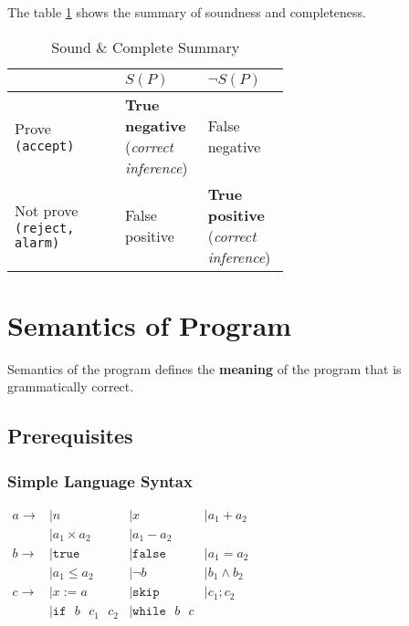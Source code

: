 The table \ref{tab:summary} shows the summary of soundness and
completeness.

\begin{table}[ht]
  \centering
  \caption{Sound \& Complete Summary}
  \label{tab:summary}

  \begin{tabular}[t]{l>{\raggedright}p{0.3\linewidth}>{\raggedright\arraybackslash}p{0.3\linewidth}}
    \hline
    & $ S(P) $ & $ \neg S(P) $ \\
    \hline
    Prove \texttt{(accept)} & \textbf{True negative} (\textsl{correct inference}) & False negative \\
    Not prove \texttt{(reject, alarm)} & False positive & \textbf{True positive} (\textsl{correct inference}) \\
    \hline
  \end{tabular}
\end{table}%



\section{Semantics of Program}
\label{sec:semantics}

Semantics of the program defines the \textbf{meaning} of the program
that is grammatically correct.

\subsection{Prerequisites}

\subsubsection{Simple Language Syntax}

\begin{math}
  \begin{array}{llll}
    a \to & \mid n & \mid x & \mid a_1 + a_2 \\
          & \mid a_1 \times a_2 & \mid a_1 - a_2 \\
    b \to & \mid \mathtt{true} & \mid \mathtt{false} & \mid a_1 = a_2  \\
          & \mid a_1 \leq a_2 & \mid \neg b & \mid b_1 \land b_2 \\
    c \to & \mid x := a  & \mid \mathtt{skip} & \mid c_1 ; c_2 \\
          & \mid \mathtt{if} \text{ }b \text{ }c_1\text{ }c_2 & \mid \mathtt{while} \text{ }b \text{ }c \\
  \end{array}
\end{math}

